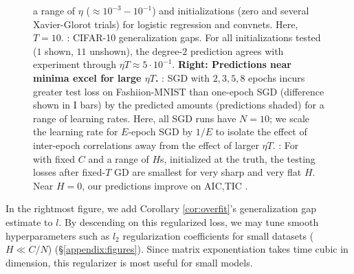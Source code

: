 \begin{figure}[h!]
{                    a range of $\eta$ ($\approx 10^{-3}-10^{-1}$) and initializations
                    (zero and several Xavier-Glorot trials) for logistic
                    regression and convnets.  Here, $T=10$. 
                    \protect{}: CIFAR-10 generalization gaps.  For all
                    initializations tested ($1$ shown, $11$ unshown), the degree-$2$
                    prediction agrees with experiment through $\eta T \approx
                    5\cdot 10^{-1}$.
                    \newline
                    {\bf Right: Predictions near minima excel for
                    large $\eta T$.} \protect{}: 
                    SGD with $2, 3, 5, 8$ epochs incurs greater test
                    loss on Fashiion-MNIST than one-epoch SGD (difference shown in I bars) by the
                    predicted amounts (predictions shaded) for a range of learning
                    rates.  Here, all SGD runs have $N=10$; we scale the learning
                    rate for $E$-epoch SGD by $1/E$ to isolate the effect of
                    inter-epoch correlations away from the effect of larger $\eta
                    T$.
                    \protect{}: For \MeanEstimation\, with fixed $C$ and
                    a range of $H$s, initialized at the truth, the testing
                    losses after fixed-$T$ GD are smallest for very sharp and
                    very flat $H$.  Near $H=0$, our predictions improve on AIC,TIC
                    \citep{di18}.
                }
                \label{fig:vanilla}
            \end{figure}


        In the rightmost figure, 
        we add Corollary \ref{cor:overfit}'s
            generalization gap estimate to $l$.  By descending on this
            regularized loss, we may tune smooth hyperparameters such as $l_2$
            regularization coefficients for small datasets ($H \ll C/N$)
            (\S\ref{appendix:figures}).  Since matrix exponentiation takes time
            cubic in dimension, this regularizer is most useful for small
            models.



